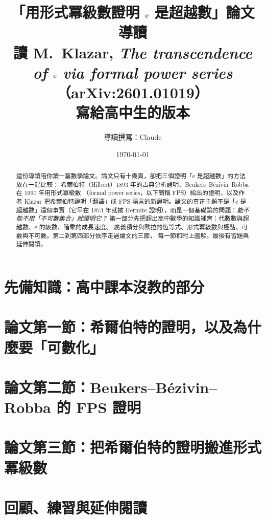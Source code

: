 \documentclass[11pt, a4paper]{article}
\title{\textbf{「用形式冪級數證明 $\e$ 是超越數」論文導讀}\\[0.6em]
  \large 讀 M.~Klazar, \emph{The transcendence of $\e$ via formal power series}（arXiv:2601.01019）\\[0.3em]
  \normalsize 寫給高中生的版本}
\author{導讀撰寫：Claude}
\date{\today}
\newcommand{\e}{\mathrm{e}}
\theoremstyle{definition}
\theoremstyle{remark}
\begin{document}
\maketitle

\begin{abstract}
\noindent
這份導讀陪你讀一篇數學論文。論文只有十幾頁，卻把三個證明「$\e$ 是超越數」的方法放在一起比較：
希爾伯特（Hilbert）1893 年的古典分析證明、Beukers--Bézivin--Robba 在 1990 年用形式冪級數
（formal power series，以下簡稱 FPS）給出的證明，以及作者 Klazar 把希爾伯特證明「翻譯」成
FPS 語言的新證明。論文的真正主題不是「$\e$ 是超越數」這個事實（它早在 1873 年就被 Hermite
證明），而是一個基礎論的問題：\emph{能不能不用「不可數集合」就證明它？}
第一部分先把超出高中數學的知識補齊：代數數與超越數、$\e$ 的級數、階乘的成長速度、
廣義積分與歐拉的恆等式、形式冪級數與極點、可數與不可數。第二到第四部分依序走過論文的三節，
每一節都附上圖解。最後有習題與延伸閱讀。
\end{abstract}

\tableofcontents
\clearpage


\clearpage
\part{先備知識：高中課本沒教的部分}




\clearpage
\part{論文第一節：希爾伯特的證明，以及為什麼要「可數化」}

\clearpage
\part{論文第二節：Beukers--Bézivin--Robba 的 FPS 證明}

\clearpage
\part{論文第三節：把希爾伯特的證明搬進形式冪級數}

\clearpage
\part{回顧、練習與延伸閱讀}

\end{document}
